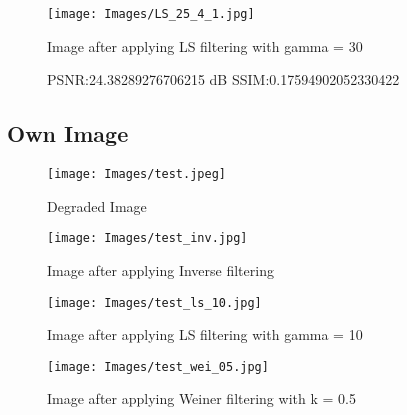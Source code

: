 \documentclass{article}
\begin{document}
\begin{figure}[!htbp]

\begin{minipage}[!b]{1.0\linewidth}
  \centering
  \centerline{\texttt{[image: Images/LS\_25\_4\_1.jpg]}}
  \centerline{Image after applying LS filtering with gamma = 30}\medskip
  PSNR:24.38289276706215 dB
  SSIM:0.17594902052330422
\end{minipage}
%
\end{figure}
\subsection[!htbp]{Own Image}

\begin{figure}[!htbp]

\begin{minipage}[!b]{1.0\linewidth}
  \centering
  \centerline{\texttt{[image: Images/test.jpeg]}}
  \centerline{Degraded Image}\medskip

\end{minipage}
%
\end{figure}

\begin{figure}[!htbp]

\begin{minipage}[!b]{1.0\linewidth}
  \centering
  \centerline{\texttt{[image: Images/test\_inv.jpg]}}
  \centerline{Image after applying Inverse filtering }\medskip

\end{minipage}
%
\end{figure}
\begin{figure}[!htbp]

\begin{minipage}[!b]{1.0\linewidth}
  \centering
  \centerline{\texttt{[image: Images/test\_ls\_10.jpg]}}
  \centerline{Image after applying LS filtering  with gamma = 10}\medskip

\end{minipage}
\end{figure}
\begin{figure}[!htbp]

\begin{minipage}[!b]{1.0\linewidth}
  \centering
  \centerline{\texttt{[image: Images/test\_wei\_05.jpg]}}
  \centerline{Image after applying Weiner filtering  with k = 0.5}\medskip

\end{minipage}
%
\end{figure}
\onecolumn
\end{document}
